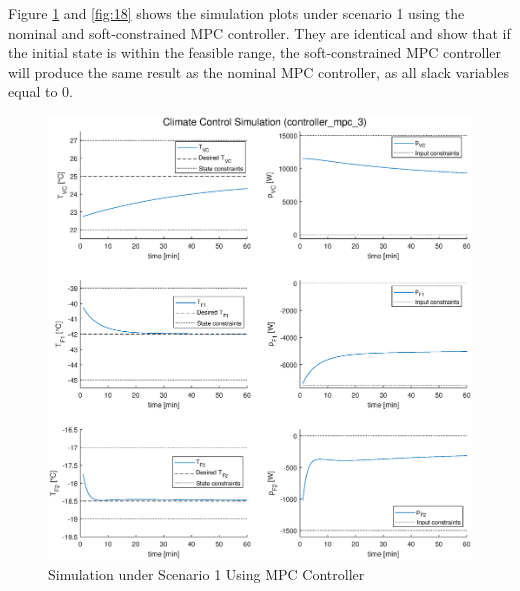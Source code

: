 \documentclass[a4paper,twoside,11pt]{article}
\numberwithin{equation}{section}
\begin{document}
Figure \ref{fig:17} and \ref{fig:18} shows the simulation plots under scenario 1 using the nominal and soft-constrained MPC controller. They are identical and show that if the initial state is within the feasible range, the soft-constrained MPC controller will produce the same result as the nominal MPC controller, as all slack variables equal to 0.

\begin{figure}[ht]
\centering
\includegraphics[scale = 0.58]{image/19-1.eps}
\caption{Simulation under Scenario 1 Using MPC Controller}
\label{fig:17}
\end{figure}

\newpage
\end{document}
